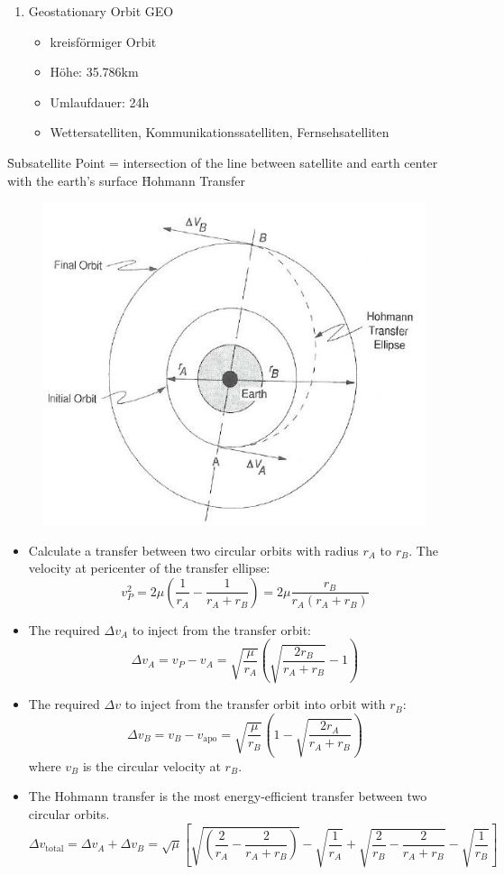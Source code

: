 \begin{enumerate}
 \item Geostationary Orbit GEO
 \begin{itemize}
  \item kreisförmiger Orbit
  \item Höhe: 35.786km
  \item Umlaufdauer: 24h
  \item Wettersatelliten, Kommunikationssatelliten, Fernsehsatelliten
 \end{itemize}

\end{enumerate}

\noindent \f{Subsatellite Point} = intersection of the line between satellite and earth center with the earth's surface 
\noindent \f{Hohmann Transfer}
\begin{figure}[!ht]
 \centering
 \includegraphics[scale=0.6]{hohmann}
\end{figure}

\begin{itemize}
\item Calculate a transfer between two circular orbits with radius $r_A$ to $r_B$. The velocity at pericenter of the transfer ellipse:
\[ v_P^2 = 2 \mu \left( \frac{1}{r_A} - \frac{1}{r_A + r_B} \right) = 2 \mu \frac{r_B}{r_A(r_A+r_B)} \]
\item The required $\Delta v_A$ to inject from the transfer orbit:
\[ \Delta v_A = v_P - v_A = \sqrt{\frac{\mu}{r_A}} \left( \sqrt{\frac{2r_B}{r_A+r_B}} -1\right) \]
\item The required $\Delta v$ to inject from the transfer orbit into orbit with $r_B$:
\[ \Delta v_B = v_B - v_\text{apo} = \sqrt{\frac{\mu}{r_B}} \left( 1 - \sqrt{\frac{2r_A}{r_A+r_B}}\right) \]
where $v_B$ is the circular velocity at $r_B$.
\item The Hohmann transfer is the most energy-efficient transfer between two circular orbits.
\[ \Delta v_\text{total} =  \Delta v_A + \Delta v_B = \sqrt{\mu}\left[ \sqrt{\left( \frac{2}{r_A} - \frac{2}{r_A+r_B} \right)} - \sqrt{\frac{1}{r_A}} + \sqrt{\frac{2}{r_B}-\frac{2}{r_A+r_B}} - \sqrt{\frac{1}{r_B}} \right]\]
\end{itemize}
